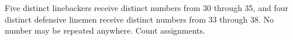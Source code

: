Five distinct linebackers receive distinct numbers from 30 through 35, and four distinct defensive linemen receive distinct numbers from 33 through 38. No number may be repeated anywhere. Count assignments.
